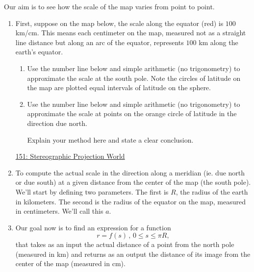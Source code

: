 \documentclass{ximera}
\begin{document}
\begin{question} \label{QPfper3r4311}
Our aim is to see how the scale of the map varies from point to point. 

\begin{enumerate}

\item First, suppose on the map below, the scale along the equator (red) is $100$ km/cm. This means each centimeter on the map, measured not as a straight line distance but along an arc of the equator, represents $100$ km along the earth's equator.

\begin{enumerate}

\item Use the number line below and simple arithmetic (no trigonometry) to approximate the scale at the south pole. Note the circles of latitude on the map are plotted equal intervals of latitude on the sphere.

\item Use the number line below and simple arithmetic (no trigonometry) to approximate the scale at points on the orange circle of latitude in the direction due north.

Explain your method here and state a clear conclusion.
\begin{freeResponse}
\end{freeResponse}

\end{enumerate}


\begin{onlineOnly}
    \begin{center}
\end{center}
\end{onlineOnly}

\href{https://www.desmos.com/calculator/wy9zoftmbe}{151: Stereographic Projection World}

\item To compute the actual scale in the direction along a meridian (ie. due north or due south) at a given distance from the center of the map (the south pole). We'll start by defining two parameters. The first is $R$, the radius of the earth in kilometers. The second is the radius of the equator on the map, measured in centimeters. We'll call this $a$.

\item Our goal now is to find an expression for a function
\[
     r = f(s) \, , \, 0\leq s \leq \pi R,
\]
that takes as an input the actual distance of a point from the north pole (measured in km) and returns as an output the distance of its image from the center of the map (measured in cm).


\end{enumerate}
\end{question}
\end{document}
